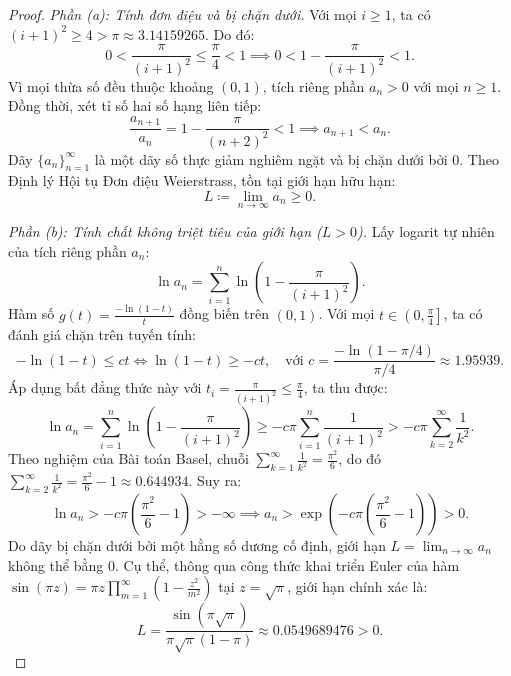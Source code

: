 \documentclass{article}
\begin{document}
\begin{proof}
\emph{Phần (a): Tính đơn điệu và bị chặn dưới.}
Với mọi $i \ge 1$, ta có $(i + 1)^2 \ge 4 > \pi \approx 3.14159265$. Do đó:
\begin{equation}
    0 < \frac{\pi}{(i + 1)^2} \le \frac{\pi}{4} < 1 \implies 0 < 1 - \frac{\pi}{(i + 1)^2} < 1.
\end{equation}
Vì mọi thừa số đều thuộc khoảng $(0, 1)$, tích riêng phần $a_n > 0$ với mọi $n \ge 1$. Đồng thời, xét tỉ số hai số hạng liên tiếp:
\begin{equation}
    \frac{a_{n+1}}{a_n} = 1 - \frac{\pi}{(n + 2)^2} < 1 \implies a_{n+1} < a_n.
\end{equation}
Dãy $\{a_n\}_{n=1}^\infty$ là một dãy số thực giảm nghiêm ngặt và bị chặn dưới bởi $0$. Theo Định lý Hội tụ Đơn điệu Weierstrass, tồn tại giới hạn hữu hạn:
\begin{equation}
    L \coloneqq \lim_{n\to\infty} a_n \ge 0.
\end{equation}

\emph{Phần (b): Tính chất không triệt tiêu của giới hạn ($L > 0$).}
Lấy logarit tự nhiên của tích riêng phần $a_n$:
\begin{equation}
    \ln a_n = \sum_{i=1}^n \ln\left(1 - \frac{\pi}{(i + 1)^2}\right).
\end{equation}
Hàm số $g(t) = \frac{-\ln(1 - t)}{t}$ đồng biến trên $(0, 1)$. Với mọi $t \in \left(0, \frac{\pi}{4}\right]$, ta có đánh giá chặn trên tuyến tính:
\begin{equation}
    -\ln(1 - t) \le c t \iff \ln(1 - t) \ge -c t, \quad \text{với } c = \frac{-\ln(1 - \pi/4)}{\pi/4} \approx 1.95939.
\end{equation}
Áp dụng bất đẳng thức này với $t_i = \frac{\pi}{(i + 1)^2} \le \frac{\pi}{4}$, ta thu được:
\begin{equation}
    \ln a_n = \sum_{i=1}^n \ln\left(1 - \frac{\pi}{(i + 1)^2}\right) \ge -c \pi \sum_{i=1}^n \frac{1}{(i + 1)^2} > -c \pi \sum_{k=2}^\infty \frac{1}{k^2}.
\end{equation}
Theo nghiệm của Bài toán Basel, chuỗi $\sum_{k=1}^\infty \frac{1}{k^2} = \frac{\pi^2}{6}$, do đó $\sum_{k=2}^\infty \frac{1}{k^2} = \frac{\pi^2}{6} - 1 \approx 0.644934$. Suy ra:
\begin{equation}
    \ln a_n > -c \pi \left(\frac{\pi^2}{6} - 1\right) > -\infty \implies a_n > \exp\left(-c \pi \left(\frac{\pi^2}{6} - 1\right)\right) > 0.
\end{equation}
Do dãy bị chặn dưới bởi một hằng số dương cố định, giới hạn $L = \lim_{n\to\infty} a_n$ không thể bằng $0$. Cụ thể, thông qua công thức khai triển Euler của hàm $\sin(\pi z) = \pi z \prod_{m=1}^\infty (1 - \frac{z^2}{m^2})$ tại $z = \sqrt{\pi}$, giới hạn chính xác là:
\begin{equation}
    L = \frac{\sin(\pi\sqrt{\pi})}{\pi\sqrt{\pi}(1 - \pi)} \approx 0.0549689476 > 0.
\end{equation}
\end{proof}
\end{document}
